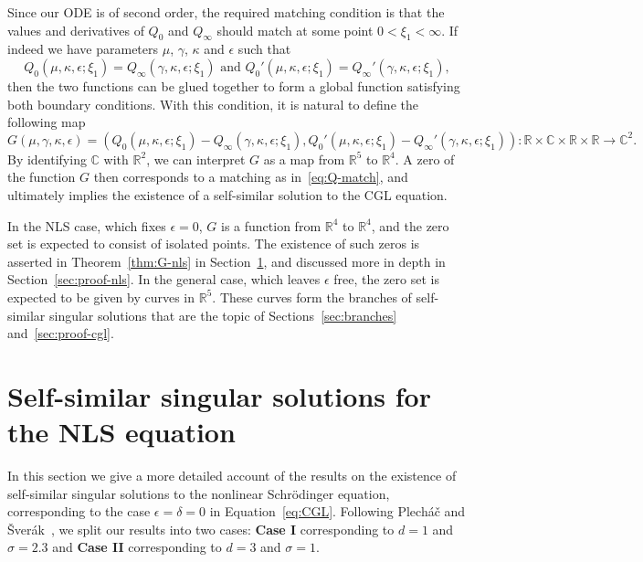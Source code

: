 \documentclass[11pt]{article}
\begin{document}
Since our ODE is of second order, the required matching condition is
that the values and derivatives of \(Q_{0}\) and
\(Q_{\infty}\) should match at some point \(0 < \xi_{1} < \infty\). If
indeed we have parameters \(\mu\), \(\gamma\), \(\kappa\) and
\(\epsilon\) such that
\begin{equation}
  \label{eq:Q-match}
  Q_{0}(\mu, \kappa, \epsilon; \xi_{1}) = Q_{\infty}(\gamma, \kappa, \epsilon; \xi_{1})
  \text{ and }
  Q_{0}'(\mu, \kappa, \epsilon; \xi_{1}) = Q_{\infty}'(\gamma, \kappa, \epsilon; \xi_{1}),
\end{equation}
then the two functions can be glued together to form a global function
satisfying both boundary conditions. With this condition, it is
natural to define the following map
\begin{equation}
  \label{eq:G}
  G(\mu, \gamma, \kappa, \epsilon) = \left(
    Q_{0}(\mu, \kappa, \epsilon; \xi_{1}) - Q_{\infty}(\gamma, \kappa, \epsilon; \xi_{1}),
    Q_{0}'(\mu, \kappa, \epsilon; \xi_{1}) - Q_{\infty}'(\gamma, \kappa, \epsilon; \xi_{1})
  \right) \colon \mathbb{R} \times \mathbb{C} \times \mathbb{R} \times \mathbb{R} \to \mathbb{C}^{2}.
\end{equation}
By identifying \(\mathbb{C}\) with \(\mathbb{R}^{2}\), we can
interpret \(G\) as a map from \(\mathbb{R}^{5}\) to
\(\mathbb{R}^{4}\). A zero of the function \(G\) then corresponds to a
matching as in~\eqref{eq:Q-match}, and ultimately implies the
existence of a self-similar solution to the CGL equation.

In the NLS case, which fixes \(\epsilon = 0\), \(G\) is a function
from \(\mathbb{R}^{4}\) to \(\mathbb{R}^{4}\), and the zero set is
expected to consist of isolated points. The existence of such zeros is
asserted in Theorem~\ref{thm:G-nls} in Section~\ref{sec:nls}, and
discussed more in depth in Section~\ref{sec:proof-nls}. In the general
case, which leaves \(\epsilon\) free, the zero set is expected to be
given by curves in \(\mathbb{R}^{5}\). These curves form the branches
of self-similar singular solutions that are the topic of
Sections~\ref{sec:branches} and~\ref{sec:proof-cgl}.

\section{Self-similar singular solutions for the NLS equation}
\label{sec:nls}
In this section we give a more detailed account of the results on the
existence of self-similar singular solutions to the nonlinear
Schrödinger equation, corresponding to the case
\(\epsilon = \delta = 0\) in Equation~\eqref{eq:CGL}. Following
Plecháč and Šverák~\cite{Plech2001}, we split our results into
two cases: \textbf{Case I} corresponding to \(d = 1\) and
\(\sigma = 2.3\) and \textbf{Case II} corresponding to \(d = 3\) and
\(\sigma = 1\).
\end{document}
